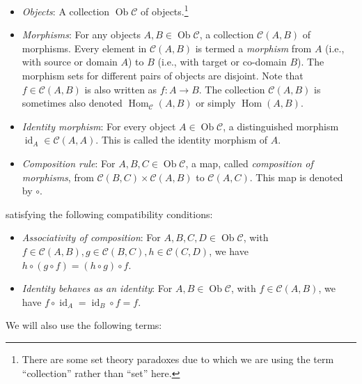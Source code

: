 \begin{itemize}
\item {\em Objects}: A collection $\operatorname{Ob}\mathcal{C}$ of
  objects.\footnote{There are some set theory paradoxes due to which
    we are using the term ``collection'' rather than ``set'' here.}
\item {\em Morphisms}: For any objects $A,B \in
  \operatorname{Ob}\mathcal{C}$, a collection $\mathcal{C}(A,B)$ of
  morphisms. Every element in $\mathcal{C}(A,B)$ is termed a {\em
    morphism} from $A$ (i.e., with source or domain $A$) to $B$ (i.e.,
  with target or co-domain $B$). The morphism sets for different pairs
  of objects are disjoint. Note that $f \in \mathcal{C}(A,B)$ is also
  written as $f:A \to B$. The collection $\mathcal{C}(A,B)$ is
  sometimes also denoted $\operatorname{Hom}_{\mathcal{C}}(A,B)$ or
  simply $\operatorname{Hom}(A,B)$.
\item {\em Identity morphism}: For every object $A \in
  \operatorname{Ob}\mathcal{C}$, a distinguished morphism
  $\operatorname{id}_A \in \mathcal{C}(A,A)$. This is called the
  identity morphism of $A$.
\item {\em Composition rule}: For $A,B,C \in
  \operatorname{Ob}\mathcal{C}$, a map, called {\em composition of
  morphisms}, from $\mathcal{C}(B,C) \times \mathcal{C}(A,B)$ to
  $\mathcal{C}(A,C)$. This map is denoted by $\circ$.
\end{itemize}

satisfying the following compatibility conditions:

\begin{itemize}
\item {\em Associativity of composition}: For $A,B,C,D \in
  \operatorname{Ob}\mathcal{C}$, with $f \in \mathcal{C}(A,B), g \in
  \mathcal{C}(B,C), h \in \mathcal{C}(C,D)$, we have $h \circ (g \circ
  f) = (h \circ g) \circ f$.
\item {\em Identity behaves as an identity}: For $A,B \in
  \operatorname{Ob}\mathcal{C}$, with $f \in \mathcal{C}(A,B)$, we
  have $f \circ \operatorname{id}_A = \operatorname{id}_B \circ f =
  f$.
\end{itemize}

We will also use the following terms:

